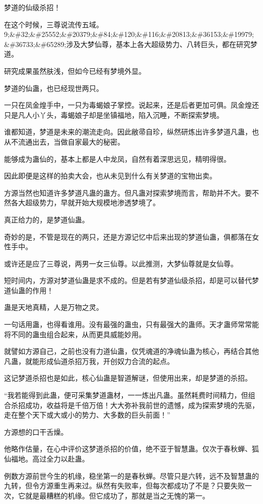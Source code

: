 \begin{this_body}
梦道的仙级杀招！

在这个时候，三尊说流传五域。9;\&\#32;\&\#25552;\&\#20379;\&\#84;\&\#120;\&\#116;\&\#20813;\&\#36153;\&\#19979;\&\#36733;\&\#65289;涉及大梦仙尊，基本上各大超级势力、八转巨头，都在研究梦道。

研究成果虽然肤浅，但如今已经有梦境外显。

梦道的仙蛊，也已经现世两只。

一只在凤金煌手中，一只为毒蝎娘子掌控。说起来，还是后者更加可俱。凤金煌还只是凡人小丫头，毒蝎娘子却是坐镇福地，陷入沉睡，不断探索梦境。

谁都知道，梦道是未来的潮流走向。因此敝帚自珍，纵然研炼出许多梦道凡蛊，也从不流通出去，当做自家最大的秘密。

能够成为蛊仙的，基本上都是人中龙凤，自然有着深思远见，精明得很。

因此即便是这样的拍卖大会，也从未见到什么有关梦道的宝物出卖。

方源当然也知道许多梦道凡蛊的蛊方。但凡蛊对探索梦境而言，帮助并不大。要不然各大超级势力，早就开始大规模地渗透梦境了。

真正给力的，是梦道仙蛊。

奇妙的是，不管是现在的两只，还是方源记忆中后来出现的梦道仙蛊，俱都落在女性手中。

或许还是应了三尊说，两男一女三仙尊。以此推测，大梦仙尊就是女仙尊。

短时间内，方源对梦道仙蛊是求不成的。但是若有梦道仙级杀招，却是可以替代梦道仙蛊的作用！

蛊是天地真精，人是万物之灵。

一句话用蛊，也得看谁用。没有最强的蛊虫，只有最强大的蛊师。天才蛊师常常能将不同的蛊虫组合起来，从而更具威能妙用。

就譬如方源自己，之前也没有力道仙蛊，仅凭魂道的净魂仙蛊为核心，再结合其他凡蛊，就能形成仙道杀招万我，开创奴力合流的起点。

这记梦道杀招也是如此，核心仙蛊是智道解谜，但使用出来，却是梦道的杀招。

“我若能得到此蛊，便可采集梦道蛊材，一一炼出凡蛊。虽然耗费时间精力，但组合杀招成功，收益将是千倍万倍！大大弥补我前世的遗憾，成为探索梦境的先驱，走在整个天下或大或小的势力、大多数的巨头前面！”

方源想的口干舌燥。

他略作估量，在心中评价这梦道杀招的价值，绝不亚于智慧蛊。仅次于春秋蝉、狐仙福地。高过全力以赴蛊。

例数方源前世今生的机缘，稳坐第一的是春秋蝉。尽管只是六转，远不及智慧蛊的九转，但令方源重生再来过。纵然有失败率，但每次都成功了不是？只要失败一次，它就是最糟糕的机缘。但它成功了，那就是当之无愧的第一。


\end{this_body}
